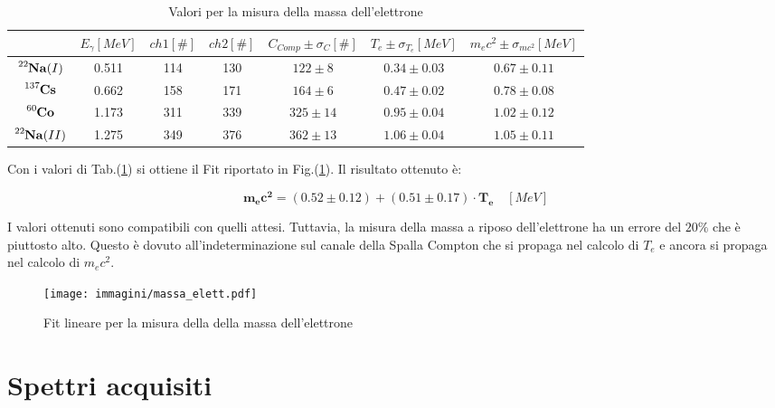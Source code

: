 \documentclass[12pt,a4paper,openright,twoside]{article}
\numberwithin{equation}{section} %
\begin{document}
\begin{table}[]
\centering
\renewcommand\arraystretch{1.2}
\begin{tabular}{|c|c|c|c|c|c|c|}
\hline
 & $E_{\gamma} [MeV]$ & $ch1 [\#]$ & $ch2 [\#]$ & $C_{Comp} \pm \sigma_C [\#]$ & $T_e \pm \sigma_{T_e} [MeV]$ & $m_e c^2 \pm \sigma_{mc^2} [MeV]$   \\ \hline
 $\ce{^{22}_{} \mathbf{Na}} (I)$& 0.511 &114  &130  & $122 \pm 8 $ & $ 0.34\pm 0.03$ &   $0.67 \pm 0.11$   \\ \hline
 $\ce{^{137}_{} \mathbf{Cs}}$ & 0.662 & 158 & 171 & $164 \pm 6$  & $ 0.47\pm 0.02$ &  $0.78 \pm 0.08 $    \\ \hline
  $\ce{^{60}_{} \mathbf{Co}}$& 1.173 & 311 & 339 & $325 \pm 14 $ & $ 0.95\pm 0.04$ &  $1.02 \pm 0.12 $    \\ \hline
  $\ce{^{22}_{} \mathbf{Na}} (II)$& 1.275 & 349 & 376 & $362 \pm 13 $ & $ 1.06\pm 0.04 $ &   $ 1.05 \pm 0.11$   \\ \hline
\end{tabular}
\caption{Valori per la misura della massa dell'elettrone}
\label{masstab}
\end{table}

Con i valori di Tab.(\ref{masstab}) si ottiene il Fit riportato in Fig.(\ref{massfit}). Il risultato ottenuto è:

\begin{equation}
\boxed{\mathbf{m_e c^2 }= (0.52 \pm 0.12) + (0.51 \pm 0.17) \cdot \mathbf{T_e}  \quad [MeV] }
\end{equation}

I valori ottenuti sono compatibili con quelli attesi. Tuttavia, la misura della massa a riposo dell'elettrone ha un errore del $20 \%$ che è piuttosto alto. Questo è dovuto all'indeterminazione sul canale della Spalla Compton che si propaga nel calcolo di $T_e$ e ancora si propaga nel calcolo di $m_e c^2$.

\begin{figure}[hbtp]
\centering
\texttt{[image: immagini/massa\_elett.pdf]}
\caption{Fit lineare per la misura della della massa dell'elettrone}
\label{massfit}
\end{figure}


\clearpage
\appendix 
\section{Spettri acquisiti} \label{a}
 
 \begin{figure}[h]
 \centering
 \end{figure}
 
\end{document}
